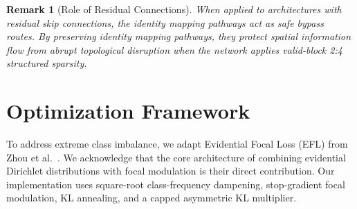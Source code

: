 \documentclass[letterpaper]{article} %
\newtheorem{remark}{Remark}
\begin{document}
\begin{remark}[Role of Residual Connections]
When applied to architectures with residual skip connections, the identity mapping pathways act as safe bypass routes. By preserving identity mapping pathways, they protect spatial information flow from abrupt topological disruption when the network applies valid-block 2:4 structured sparsity.
\end{remark}

\section{Optimization Framework}\label{sec:optimization}

To address extreme class imbalance, we adapt Evidential Focal Loss (EFL) from Zhou et al.~\cite{zhou2023domain}. We acknowledge that the core architecture of combining evidential Dirichlet distributions with focal modulation is their direct contribution. Our implementation uses square-root class-frequency dampening, stop-gradient focal modulation, KL annealing, and a capped asymmetric KL multiplier.
\end{document}
